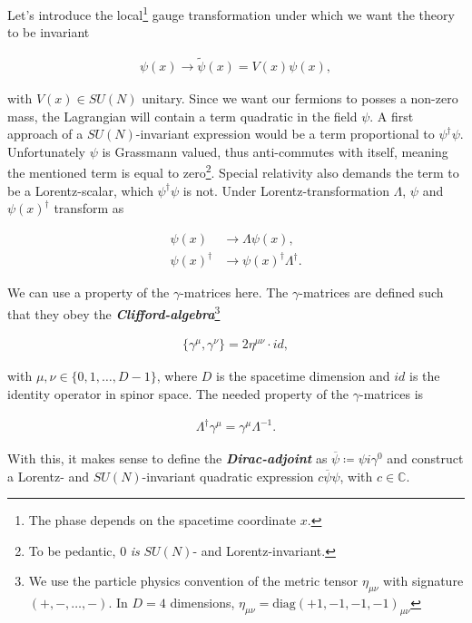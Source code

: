 \documentclass{article}
\theoremstyle{plain} %
\theoremstyle{convention} %
\theoremstyle{remark} %
\def\df#1{\textbf{\textit{#1}}}
\numberwithin{equation}{section}
\begin{document}
Let's introduce the local\footnote{The phase depends on the spacetime coordinate $x$.} gauge transformation under which we want the theory to be invariant

\begin{align*}
    \psi(x) \longrightarrow \tilde{\psi}(x) = V(x) \psi(x),
\end{align*}

with $V(x) \in SU(N)$ unitary. Since we want our fermions to posses a non-zero mass, the Lagrangian will contain a term quadratic in the field $\psi$. A first approach of a $SU(N)$-invariant expression would be a term proportional to $\psi^{\dagger} \psi$. Unfortunately $\psi$ is Grassmann valued, thus anti-commutes with itself, meaning the mentioned term is equal to zero\footnote{To be pedantic, $0$ \textit{is} $SU(N)$- and Lorentz-invariant.}. Special relativity also demands the term to be a Lorentz-scalar, which $\psi^{\dagger} \psi$ is not. Under Lorentz-transformation $\Lambda$, $\psi$ and $\psi(x)^{\dagger}$ transform as

\begin{align*}
    \psi(x) &\longrightarrow \Lambda \psi(x), \\
    \psi(x)^{\dagger} &\longrightarrow \psi(x)^{\dagger} \Lambda^{\dagger}.
\end{align*}

We can use a property of the $\gamma$-matrices here. The $\gamma$-matrices are defined such that they obey the \df{Clifford-algebra}\footnote{We use the particle physics convention of the metric tensor $\eta_{\mu \nu}$ with signature $(+,-,\dots,-)$. In $D=4$ dimensions, $\eta_{\mu \nu} = \mathrm{diag}(+1, -1, -1, -1)_{\mu \nu}$}

\begin{align}
    \{\gamma^{\mu}, \gamma^{\nu}\} = 2 \eta^{\mu \nu} \cdot id, \label{eq:cliff}
\end{align}

with $\mu,\nu \in \{0, 1, \dots, D-1\}$, where $D$ is the spacetime dimension and $id$ is the identity operator in spinor space. The needed property of the $\gamma$-matrices is

\begin{align*}
    \Lambda^{\dagger} \gamma^{\mu} = \gamma^{\mu} \Lambda^{-1}.
\end{align*}

With this, it makes sense to define the \df{Dirac-adjoint} as $\overline{\psi} \coloneqq \psi i \gamma^0$ and construct a Lorentz- and $SU(N)$-invariant quadratic expression $c \overline{\psi} \psi$, with $c \in \mathbb{C}$.
\end{document}

